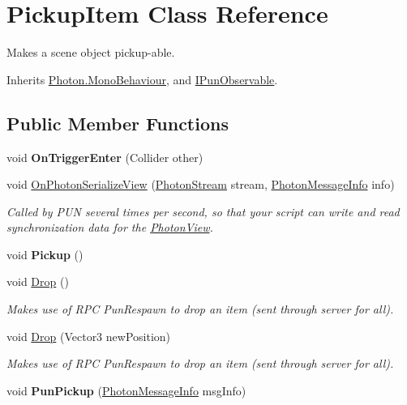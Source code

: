 \hypertarget{class_pickup_item}{}\section{Pickup\+Item Class Reference}
\label{class_pickup_item}


Makes a scene object pickup-\/able.  




Inherits \hyperlink{class_photon_1_1_mono_behaviour}{Photon.\+Mono\+Behaviour}, and \hyperlink{interface_i_pun_observable}{I\+Pun\+Observable}.

\subsection*{Public Member Functions}
\begin{DoxyCompactItemize}
\item 
void {\bfseries On\+Trigger\+Enter} (Collider other)\hypertarget{class_pickup_item_a785a8b65e46fc44ab4fdeb5411e01351}{}\label{class_pickup_item_a785a8b65e46fc44ab4fdeb5411e01351}

\item 
void \hyperlink{class_pickup_item_a7b6809bac46d2eaddc309e2ad97167fa}{On\+Photon\+Serialize\+View} (\hyperlink{class_photon_stream}{Photon\+Stream} stream, \hyperlink{class_photon_message_info}{Photon\+Message\+Info} info)
\begin{DoxyCompactList}\small\item\em Called by P\+UN several times per second, so that your script can write and read synchronization data for the \hyperlink{class_photon_view}{Photon\+View}. \end{DoxyCompactList}\item 
void {\bfseries Pickup} ()\hypertarget{class_pickup_item_aed8f232a2849e9640b1ba4f32077bb16}{}\label{class_pickup_item_aed8f232a2849e9640b1ba4f32077bb16}

\item 
void \hyperlink{class_pickup_item_aa23d18ee93cd9591072f01da535370bc}{Drop} ()
\begin{DoxyCompactList}\small\item\em Makes use of R\+PC Pun\+Respawn to drop an item (sent through server for all).\end{DoxyCompactList}\item 
void \hyperlink{class_pickup_item_a7fab906a78c790fe991bf63a812ae8cf}{Drop} (Vector3 new\+Position)
\begin{DoxyCompactList}\small\item\em Makes use of R\+PC Pun\+Respawn to drop an item (sent through server for all).\end{DoxyCompactList}\item 
void {\bfseries Pun\+Pickup} (\hyperlink{class_photon_message_info}{Photon\+Message\+Info} msg\+Info)\hypertarget{class_pickup_item_a2a170d7c2a6c7bd0e0491ab233380186}{}\label{class_pickup_item_a2a170d7c2a6c7bd0e0491ab233380186}

\end{DoxyCompactItemize}
